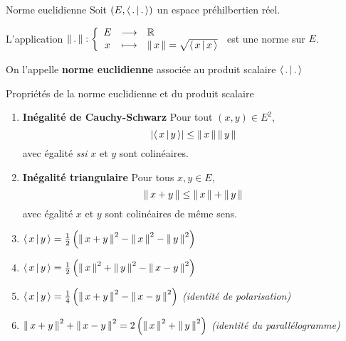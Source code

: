         \begin{defitheo}{Norme euclidienne}{}
            Soit $(E,\left<\,.\,\middle|\,.\,\right>)$ un espace préhilbertien réel.
    
            L’application $\fonction{\norm{.}}{E}{\mathbb{R}}{x}{\norm{x} = \sqrt{\spr{x}{x}}}$ est une norme sur $E$.
    
            On l’appelle \textbf{norme euclidienne} associée au produit scalaire $\left<\,.\,\middle|\,.\,\right>$
        \end{defitheo}

        \begin{theo}{Propriétés de la norme euclidienne et du produit scalaire}{}
            \begin{enumerate}[label=\textcolor{myred}{\textbf{(\alph*)}}]
                \item \textbf{Inégalité de Cauchy-Schwarz} \quad Pour tout $(x,y) \in E^2$, 
                \[ \left\lvert \left<\,x\,\middle|\,y\,\right>\right\rvert \leq \left\lVert\,x\,\right\rVert \left\lVert\,y\,\right\rVert \]   
                avec égalité \textit{ssi} $x$ et $y$ sont colinéaires.
                \item \textbf{Inégalité triangulaire} \quad Pour tous $x,y \in E$, 
                \[ \left\lVert\,x+y\,\right\rVert \leq \left\lVert\,x\,\right\rVert + \left\lVert\,y\,\right\rVert \]    
                avec égalité  $x$ et $y$ sont colinéaires de même sens.
                \item $\left<\,x\,\middle|\,y\,\right> = \frac{1}{2} \left(\left\lVert\,x+y\,\right\rVert^2 - \left\lVert\,x\,\right\rVert^2 - \left\lVert\,y\,\right\rVert^2\right)$
                \item $\left<\,x\,\middle|\,y\,\right> = \frac{1}{2} \left(\left\lVert\,x\,\right\rVert^2 + \left\lVert\,y\,\right\rVert^2 - \left\lVert\,x-y\,\right\rVert^2\right)$
                \item $\left<\,x\,\middle|\,y\,\right> = \frac{1}{4} \left(\left\lVert\,x+y\,\right\rVert^2 - \left\lVert\,x-y\,\right\rVert^2\right)$ \quad \textit{(identité de polarisation)}
                \item $\left\lVert\,x+y\,\right\rVert^2 + \left\lVert\,x-y\,\right\rVert^2 = 2 \left(\left\lVert\,x\,\right\rVert^2 + \left\lVert\,y\,\right\rVert^2 \right)$ \quad \textit{(identité du parallélogramme)}
            \end{enumerate}
        \end{theo}

